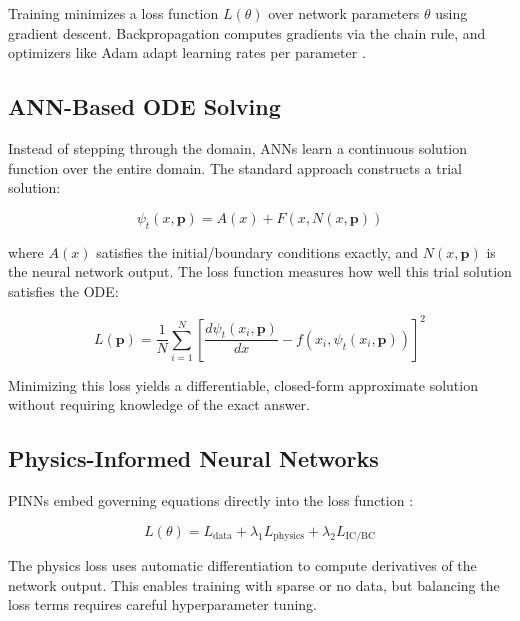 Training minimizes a loss function $L(\theta)$ over network parameters $\theta$ using gradient descent. Backpropagation computes gradients via the chain rule, and optimizers like Adam adapt learning rates per parameter \cite{dubey2024solving, audu2026neural}.

\subsection{ANN-Based ODE Solving}

Instead of stepping through the domain, ANNs learn a continuous solution function over the entire domain. The standard approach \cite{mall2013comparison, okereke2021novel} constructs a trial solution:

\begin{equation}
\psi_t(x, \mathbf{p}) = A(x) + F(x, N(x, \mathbf{p}))
\label{eq:trial_solution}
\end{equation}

where $A(x)$ satisfies the initial/boundary conditions exactly, and $N(x, \mathbf{p})$ is the neural network output. The loss function measures how well this trial solution satisfies the ODE:

\begin{equation}
L(\mathbf{p}) = \frac{1}{N} \sum_{i=1}^{N} \left[ \frac{d\psi_t(x_i, \mathbf{p})}{dx} - f(x_i, \psi_t(x_i, \mathbf{p})) \right]^2
\label{eq:ode_loss}
\end{equation}

Minimizing this loss yields a differentiable, closed-form approximate solution without requiring knowledge of the exact answer.

\subsection{Physics-Informed Neural Networks}

PINNs embed governing equations directly into the loss function \cite{matthews2024pinnde, babni2025error, audu2026neural}:

\begin{equation}
L(\theta) = L_{\text{data}} + \lambda_1 L_{\text{physics}} + \lambda_2 L_{\text{IC/BC}}
\end{equation}

The physics loss uses automatic differentiation to compute derivatives of the network output. This enables training with sparse or no data, but balancing the loss terms requires careful hyperparameter tuning.

